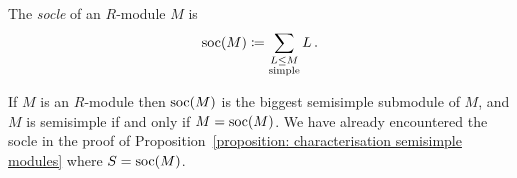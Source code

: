

\begin{definition}
  The \emph{socle} of an $R$-module $M$ is
  \[
              \operatorname{soc}(M)
    \coloneqq  \sum_{\substack{L \leq M \\ \text{simple}}} L \,.
  \]
\end{definition}


\begin{remark}
  If $M$ is an $R$-module then $\operatorname{soc}(M)$ is the biggest semisimple submodule of $M$, and $M$ is semisimple if and only if $M = \operatorname{soc}(M)$.
  We have already encountered the socle in the proof of Proposition~\ref{proposition: characterisation semisimple modules} where $S = \operatorname{soc}(M)$.
\end{remark}




